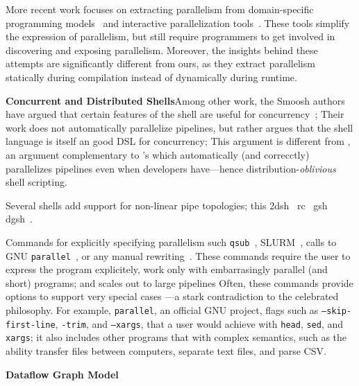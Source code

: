 \documentclass[sigplan,10pt,review,anonymous]{acmart}
\newcommand{\heading}[1]{\vspace{4pt}\noindent\textbf{#1}\enspace}
\newcommand{\ttt}[1]{\texttt{\small #1}}
\newcommand{\tti}[1]{\texttt{\scriptsize #1}}
\newcommand{\nv}[1]{[{\color{cyan}#1 --- Nikos}]}
\begin{document}
More recent work focuses on extracting parallelism from domain-specific programming models~\cite{cilk5, streamIt, galois} and interactive parallelization tools~\cite{parascope, ipat}.
These tools simplify the expression of parallelism, but still require programmers to get involved in discovering and exposing parallelism.
Moreover, the insights behind these attempts are significantly different from ours, as they extract parallelism statically during compilation instead of dynamically during runtime.

\heading{Concurrent and Distributed Shells}
\nv{NV}
Among other work, the Smoosh authors have argued that certain features of the shell are useful for concurrency~\cite{smoosh:18};
Their work does not automatically parallelize pipelines, but rather argues that the shell language is itself an good DSL for concurrency;
This argument is different from \sys, 
an argument complementary to \sys's which automatically (and correcctly) parallelizes pipelines even when developers have---hence distribution-\emph{oblivious} shell scripting.

Several shells add support for non-linear pipe topologies;
  this 
2dsh~\cite{}
rc~\cite{}
gsh~\cite{}
dgsh~\cite{dagsh:17}.

Commands for explicitly specifying parallelism such \ttt{qsub}~\cite{gentzsch2001sun}, \textsc{SLURM}~\cite{yoo2003slurm}, calls to \textsc{GNU} \ttt{parallel}~\cite{Tange2011a}, or any manual rewriting~\cite{mapreduce:08, ciel:11, spark:12}.
These commands require the user to express the program explicitely, work only with embarrasingly parallel (and short) programs;
  \sys and scales out to large pipelines
Often, these commands provide options to support very special cases
---a stark contradiction to the celebrated \unix philosophy.
For example, \tti{parallel}, an official GNU project, flags such as \ttt{--skip-first-line}, \ttt{-trim}, and \ttt{--xargs}, that a \unix user would achieve with \ttt{head}, \ttt{sed}, and \ttt{xargs}; it also includes other programs that 
with complex semantics, such as the ability transfer files between computers, separate text files, and parse CSV.


\heading{Dataflow Graph Model}
\end{document}

